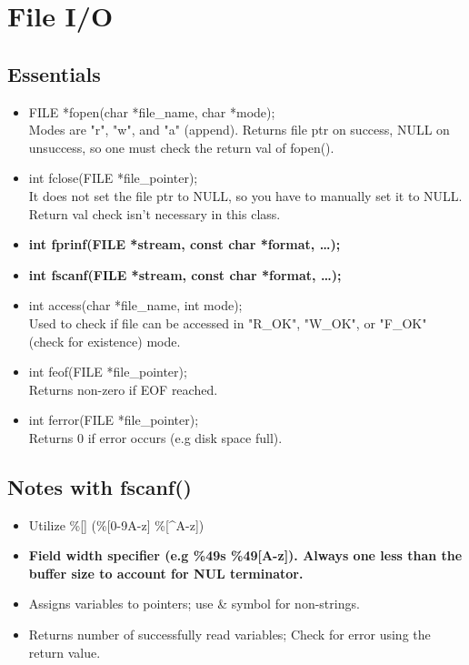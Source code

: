 \documentclass{article}
\begin{document}
\section{File I/O}

\subsection{Essentials}
\begin{itemize}
    \item FILE *fopen(char *file\_name, char *mode);\\
    Modes are "r", "w", and "a" (append). Returns file ptr on success, NULL on unsuccess, so one must check the return val of fopen().
    \item int fclose(FILE *file\_pointer);\\
    It does not set the file ptr to NULL, so you have to manually set it to NULL. Return val check isn't necessary in this class.
    \item \textbf{int fprinf(FILE *stream, const char *format, \dots);}
    \item \textbf{int fscanf(FILE *stream, const char *format, \dots);}
    \item int access(char *file\_name, int mode);\\
    Used to check if file can be accessed in "R\_OK", "W\_OK", or "F\_OK" (check for existence) mode.
    \item int feof(FILE *file\_pointer);\\
    Returns non-zero if EOF reached.
    \item int ferror(FILE *file\_pointer);\\
    Returns 0 if error occurs (e.g disk space full).
\end{itemize}

\subsection{Notes with fscanf()}
\begin{itemize}
    \item Utilize \%[] (\%[0-9A-z] \%[\^{}A-z])
    \item \textbf{Field width specifier (e.g \%49s \%49[A-z]). Always one less than the buffer size to account for NUL terminator.}
    \item Assigns variables to pointers; use \& symbol for non-strings.
    \item Returns number of successfully read variables; Check for error using the return value.
\end{itemize}
\end{document}
